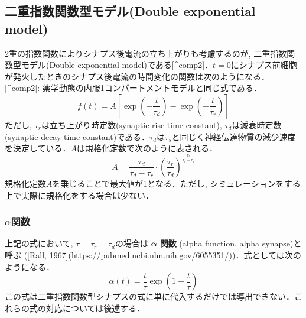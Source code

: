 \subsection{二重指数関数型モデル(Double exponential model)}2重の指数関数によりシナプス後電流の立ち上がりも考慮するのが, 二重指数関数型モデル(Double exponential model)である[^comp2]．$t=0$にシナプス前細胞が発火したときのシナプス後電流の時間変化の関数は次のようになる．
[^comp2]: 薬学動態の内服1コンパートメントモデルと同じ式である．
$$
\begin{equation}
f(t)=A\left[\exp\left(-\frac{t}{\tau_d}\right)-\exp\left(-\frac{t}{\tau_r}\right)\right]    
\end{equation}
$$
ただし, ${\tau_r}$は立ち上がり時定数(synaptic rise time constant), ${\tau_d}$は減衰時定数(synaptic decay time constant)である．$\tau_{d}$は$\tau_{s}$と同じく神経伝達物質の減少速度を決定している．$A$は規格化定数で次のように表される．
$$
\begin{equation}
A=\frac{\tau_d}{\tau_d-\tau_r}\cdot \left(\frac{\tau_r}{\tau_d}\right)^\frac{\tau_r}{\tau_r-\tau_d}    
\end{equation}
$$
規格化定数$A$を乗じることで最大値が1となる．ただし, シミュレーションをする上で実際に規格化をする場合は少ない．
\subsubsection{$\alpha$関数}上記の式において, $\tau=\tau_{r}=\tau_{d}$の場合は $\boldsymbol{\alpha}$ \textbf{関数} (alpha function, alpha synapse)と呼ぶ ([Rall, 1967](https://pubmed.ncbi.nlm.nih.gov/6055351/))．式としては次のようになる．
$$
\begin{equation}
\alpha(t)=\frac{t}{\tau}\exp\left(1-\frac{t}{\tau}\right)    
\end{equation}
$$
この式は二重指数関数型シナプスの式に単に代入するだけでは導出できない．これらの式の対応については後述する．
